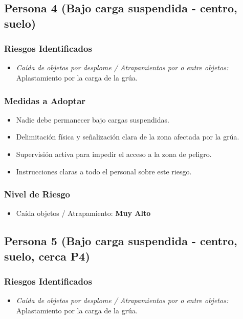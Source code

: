 \documentclass[12pt,a4paper]{article}
\begin{document}
	\bigskip\hrulefill\bigskip
	
	\subsection{Persona 4 (Bajo carga suspendida - centro, suelo)}
	
	\subsubsection{Riesgos Identificados}
	\begin{itemize}
		\item \textit{Caída de objetos por desplome / Atrapamientos por o entre objetos:} Aplastamiento por la carga de la grúa.
	\end{itemize}
	
	\subsubsection{Medidas a Adoptar}
	\begin{itemize}
		\item Nadie debe permanecer bajo cargas suspendidas.
		\item Delimitación física y señalización clara de la zona afectada por la grúa.
		\item Supervisión activa para impedir el acceso a la zona de peligro.
		\item Instrucciones claras a todo el personal sobre este riesgo.
	\end{itemize}
	
	\subsubsection{Nivel de Riesgo}
	\begin{itemize}
		\item Caída objetos / Atrapamiento: \textbf{Muy Alto}
	\end{itemize}
	
	\bigskip\hrulefill\bigskip
	
	\subsection{Persona 5 (Bajo carga suspendida - centro, suelo, cerca P4)}
	
	\subsubsection{Riesgos Identificados}
	\begin{itemize}
		\item \textit{Caída de objetos por desplome / Atrapamientos por o entre objetos:} Aplastamiento por la carga de la grúa.
	\end{itemize}
	
\end{document}
